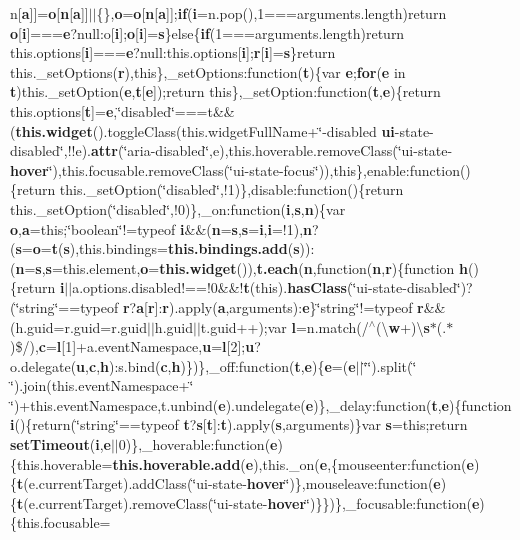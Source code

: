 {n}\mbox{[}{\bf a}\mbox{]}\mbox{]}={\bf o}\mbox{[}{\bf n}\mbox{[}{\bf a}\mbox{]}\mbox{]}$\vert$$\vert$\{\},{\bf o}={\bf o}\mbox{[}{\bf n}\mbox{[}{\bf a}\mbox{]}\mbox{]};{\bf if}({\bf i}=n.\-pop(),1===arguments.\-length)return {\bf o}\mbox{[}{\bf i}\mbox{]}==={\bf e}?null\-:o\mbox{[}{\bf i}\mbox{]};{\bf o}\mbox{[}{\bf i}\mbox{]}={\bf s}\}else\{{\bf if}(1===arguments.\-length)return this.\-options\mbox{[}{\bf i}\mbox{]}==={\bf e}?null\-:this.\-options\mbox{[}{\bf i}\mbox{]};{\bf r}\mbox{[}{\bf i}\mbox{]}={\bf s}\}return this.\-\_\-set\-Options({\bf r}),this\},\-\_\-set\-Options\-:function({\bf t})\{var {\bf e};{\bf for}({\bf e} in {\bf t})this.\-\_\-set\-Option({\bf e},{\bf t}\mbox{[}{\bf e}\mbox{]});return this\},\-\_\-set\-Option\-:function({\bf t},{\bf e})\{return this.\-options\mbox{[}{\bf t}\mbox{]}={\bf e},\char`\"{}disabled\char`\"{}===t\&\&({\bf this.\-widget}().toggle\-Class(this.\-widget\-Full\-Name+\char`\"{}-\/disabled {\bf ui}-\/state-\/disabled\char`\"{},!!e).{\bf attr}(\char`\"{}aria-\/disabled\char`\"{},e),this.\-hoverable.\-remove\-Class(\char`\"{}ui-\/state-\/{\bf hover}\char`\"{}),this.\-focusable.\-remove\-Class(\char`\"{}ui-\/state-\/focus\char`\"{})),this\},enable\-:function()\{return this.\-\_\-set\-Option(\char`\"{}disabled\char`\"{},!1)\},disable\-:function()\{return this.\-\_\-set\-Option(\char`\"{}disabled\char`\"{},!0)\},\-\_\-on\-:function({\bf i},{\bf s},{\bf n})\{var {\bf o},{\bf a}=this;\char`\"{}boolean\char`\"{}!=typeof {\bf i}\&\&({\bf n}={\bf s},{\bf s}={\bf i},{\bf i}=!1),{\bf n}?({\bf s}={\bf o}={\bf t}({\bf s}),this.\-bindings={\bf this.\-bindings.\-add}({\bf s}))\-:({\bf n}={\bf s},{\bf s}=this.\-element,{\bf o}={\bf this.\-widget}()),{\bf t.\-each}({\bf n},function({\bf n},{\bf r})\{function {\bf h}()\{return {\bf i}$\vert$$\vert$a.\-options.\-disabled!==!0\&\&!{\bf t}(this).{\bf has\-Class}(\char`\"{}ui-\/state-\/disabled\char`\"{})?(\char`\"{}string\char`\"{}==typeof {\bf r}?{\bf a}\mbox{[}{\bf r}\mbox{]}\-:{\bf r}).apply({\bf a},arguments)\-:{\bf e}\}\char`\"{}string\char`\"{}!=typeof {\bf r}\&\&(h.\-guid=r.\-guid=r.\-guid$\vert$$\vert$h.\-guid$\vert$$\vert$t.\-guid++);var {\bf l}=n.\-match(/$^\wedge$(\textbackslash{}{\bf w}+)\textbackslash{}{\bf s}$\ast$(.$\ast$)\$/),{\bf c}={\bf l}\mbox{[}1\mbox{]}+a.\-event\-Namespace,{\bf u}={\bf l}\mbox{[}2\mbox{]};{\bf u}?o.\-delegate({\bf u},{\bf c},{\bf h})\-:s.\-bind({\bf c},{\bf h})\})\},\-\_\-off\-:function({\bf t},{\bf e})\{{\bf e}=({\bf e}$\vert$$\vert$\char`\"{}\char`\"{}).split(\char`\"{} \char`\"{}).join(this.\-event\-Namespace+\char`\"{} \char`\"{})+this.\-event\-Namespace,t.\-unbind({\bf e}).undelegate({\bf e})\},\-\_\-delay\-:function({\bf t},{\bf e})\{function {\bf i}()\{return(\char`\"{}string\char`\"{}==typeof {\bf t}?{\bf s}\mbox{[}{\bf t}\mbox{]}\-:{\bf t}).apply({\bf s},arguments)\}var {\bf s}=this;return {\bf set\-Timeout}({\bf i},{\bf e}$\vert$$\vert$0)\},\-\_\-hoverable\-:function({\bf e})\{this.\-hoverable={\bf this.\-hoverable.\-add}({\bf e}),this.\-\_\-on({\bf e},\{mouseenter\-:function({\bf e})\{{\bf t}(e.\-current\-Target).add\-Class(\char`\"{}ui-\/state-\/{\bf hover}\char`\"{})\},mouseleave\-:function({\bf e})\{{\bf t}(e.\-current\-Target).remove\-Class(\char`\"{}ui-\/state-\/{\bf hover}\char`\"{})\}\})\},\-\_\-focusable\-:function({\bf e})\{this.\-focusable={\bf }

